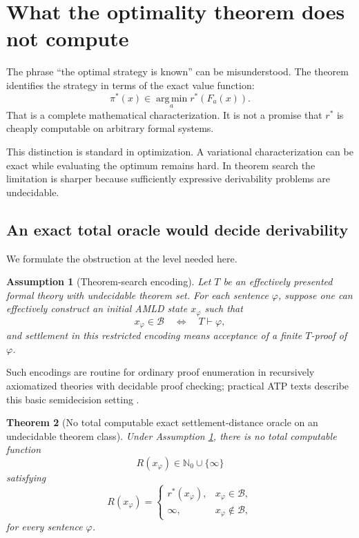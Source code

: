 \documentclass[11pt,letterpaper]{article}
\newtheorem{theorem}{Theorem}[section]
\newtheorem{assumption}[theorem]{Assumption}
\theoremstyle{remark}
\newcommand{\Basin}{\mathcal B}
\newcommand{\N}{\mathbb N}
\newcommand{\rstar}{r^{\!*}}
\newcommand{\argmin}{\operatorname*{arg\,min}}
\begin{document}
\section{What the optimality theorem does not compute}\label{sec:limits}

The phrase ``the optimal strategy is known'' can be misunderstood. The theorem identifies the strategy in terms of the exact value function:
\[
\pi^*(x)\in\argmin_a\rstar(F_a(x)).
\]
That is a complete mathematical characterization. It is not a promise that $\rstar$ is cheaply computable on arbitrary formal systems.

This distinction is standard in optimization. A variational characterization can be exact while evaluating the optimum remains hard. In theorem search the limitation is sharper because sufficiently expressive derivability problems are undecidable.

\subsection{An exact total oracle would decide derivability}

We formulate the obstruction at the level needed here.

\begin{assumption}[Theorem-search encoding]\label{ass:encoding}
Let $T$ be an effectively presented formal theory with undecidable theorem set. For each sentence $\varphi$, suppose one can effectively construct an initial AMLD state $x_\varphi$ such that
\[
x_\varphi\in\Basin\quad\Longleftrightarrow\quad T\vdash\varphi,
\]
and settlement in this restricted encoding means acceptance of a finite $T$-proof of $\varphi$.
\end{assumption}

Such encodings are routine for ordinary proof enumeration in recursively axiomatized theories with decidable proof checking; practical ATP texts describe this basic semidecision setting \cite{Harrison,Metamath}.

\begin{theorem}[No total computable exact settlement-distance oracle on an undecidable theorem class]\label{thm:undecidable}
Under Assumption \ref{ass:encoding}, there is no total computable function
\[
R(x_\varphi)\in\N_0\cup\{\infty\}
\]
satisfying
\[
R(x_\varphi)=
\begin{cases}
\rstar(x_\varphi),&x_\varphi\in\Basin,\\
\infty,&x_\varphi\notin\Basin,
\end{cases}
\]
for every sentence $\varphi$.
\end{theorem}
\end{document}
